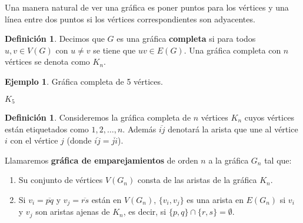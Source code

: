 \documentclass[12pt]{book}
\theoremstyle{definition}
\newtheorem{definition}[theorem]{Definición}
\newtheorem{example}[theorem]{Ejemplo}
\newcounter{in}
\newcounter{ini}
\begin{document}
Una manera natural de ver una gráfica es poner puntos para los
vértices y una línea entre dos puntos si los vértices correspondientes
son adyacentes.
\begin{definition}
  Decimos que $G$ es una gráfica \textbf{completa} si para
  todos~$u,v\in V(G)$ con $u\neq v$ se tiene que $uv\in E(G)$. Una gráfica completa con
  $n$ vértices se denota como $K_{n}$.
\end{definition}
\begin{example}
  Gráfica completa de 5 vértices.
  \bigskip

  \begin{minipage}{1.0\linewidth}
    \centering
  
    $K_{5}$
  \end{minipage}
  \label{fig:K5}
\end{example}

\begin{definition}
  \label{graf-emparejamientos}
  Consideremos la gráfica completa de $n$ vértices $K_{n}$ cuyos
  vértices están etiquetados como $1,2,\ldots,n$. Además
  $\overline{ij}$ denotará la arista que une al vértice $i$ con el
  vértice $j$ (donde $\overline{ij}=\overline{ji}$).
  
  Llamaremos \textbf{gráfica de emparejamientos} de orden $n$ a la
  gráfica $G_{n}$ tal que:
  
  \begin{enumerate}
  \item Su conjunto de vértices $V(G_{n})$ consta de las aristas de la gráfica
    $K_{n}$. 
  \item Si $v_{i}=\overline{pq}$ y $v_{j}=\overline{rs}$ están en
    $V(G_{n})$, $\{v_{i},v_{j}\}$ es una arista en $E(G_{n})$ si $v_{i}$
    y $v_{j}$ son aristas ajenas de $K_{n}$, es decir, si $\{p,q\}\cap\{r,s\}=\emptyset$.
  \end{enumerate}
\end{definition} 
\end{document}
